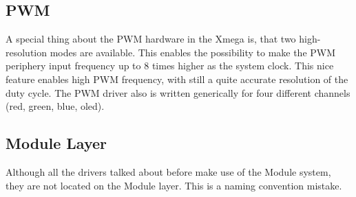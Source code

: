 \subsection{PWM}
A special thing about the PWM hardware in the Xmega is, that two high-resolution
modes are available. This enables the possibility to make the PWM periphery
input frequency up to 8 times higher as the system clock. This nice feature
enables high PWM frequency, with still a quite accurate resolution of the duty
cycle. The PWM driver also is written generically for four different channels
(red, green, blue, oled).

\subsection{Module Layer}
Although all the drivers talked about before make use of the Module system, they are not located on the Module layer. This is a naming convention mistake.
